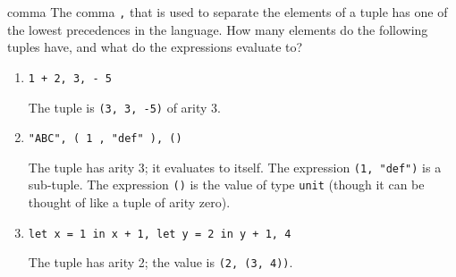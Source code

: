 %
%
%
\exercises

\begin{exercise}{comma}
The comma \hbox{\lstinline/,/} that is used to separate the elements of a tuple has one of the lowest
precedences in the language.  How many elements do the following tuples have, and what do the
expressions evaluate to?

\begin{enumerate}
\item \lstinline!1 + 2, 3, - 5!

\begin{answer}\ifanswers
The tuple is \hbox{\lstinline/(3, 3, -5)/} of arity 3.
\fi\end{answer}

\item \lstinline!"ABC", ( 1 , "def" ), ()!

\begin{answer}\ifanswers
The tuple has arity 3; it evaluates to itself.  The expression \hbox{\lstinline/(1, "def")/} is a
sub-tuple.  The expression \hbox{\lstinline/()/} is the value of type \hbox{\lstinline/unit/} (though it can be
thought of like a tuple of arity zero).
\fi\end{answer}

\item \lstinline!let x = 1 in x + 1, let y = 2 in y + 1, 4!

\begin{answer}\ifanswers
The tuple has arity 2; the value is \hbox{\lstinline/(2, (3, 4))/}.
\fi\end{answer}
\end{enumerate}
\end{exercise}

